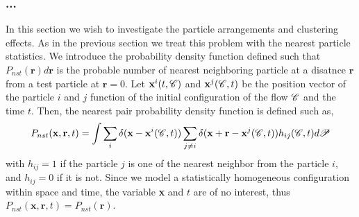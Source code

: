 \subsubsection{...}


In this section we wish to investigate the particle arrangements and clustering effects. 
As in the previous section we treat this problem with the nearest particle statistics.
We introduce the probability density function defined such that $P_{nst}(\textbf{r})d\textbf{r}$ is the probable number of nearest neighboring particle at a disatnce $\textbf{r}$ from a test particle at $\textbf{r} = 0$. 
Let $\textbf{x}^i(t,\mathscr{C})$ and $\textbf{x}^j(\mathscr{C},t)$ be the position vector of the particle $i$ and $j$ function of the initial configuration of the flow $\mathscr{C}$ and the time $t$. 
Then, the nearest pair probability density function is defined such as, 
\begin{equation}
    P_{nst}(\textbf{x},\textbf{r},t)= 
    \int \sum_{i}\delta(\textbf{x}-\textbf{x}^i(\mathscr{C},t))
    \sum_{j\neq i}\delta(\textbf{x}+\textbf{r}-\textbf{x}^j(\mathscr{C},t)) 
    h_{ij}(\mathscr{C},t) d\mathscr{P} 
    \label{eq:P_nstij}
\end{equation}
with $h_{ij} = 1$ if the particle $j$ is one of the nearest neighbor from the particle $i$, and $h_{ij} = 0$ if it is not. 
Since we model a statistically homogeneous configuration within space and time, the variable \textbf{x} and $t$ are of no interest, thus $P_{nst}(\textbf{x},\textbf{r},t) = P_{nst}(\textbf{r})$. 
